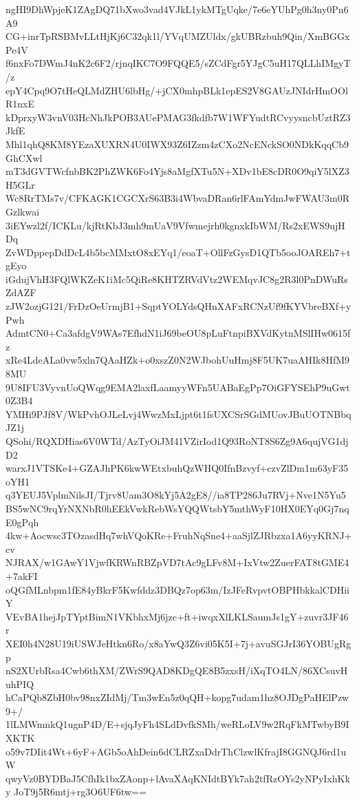 ngHI9DhWpjeK1ZAgDQ71bXwo3vad4VJkL1ykMTgUqke/7e6eYUhPg0h3ny0Pn6A9
CG+inrTpRSBMvLLtHjKj6C32qk1l/YVqUMZUldx/gkUBRzbuh9Qin/XmBGGxPe4V
f6nxFo7DWmJ4nK2c6F2/rjnqIKC7O9FQQE5/sZCdFgr5YJgC5uH17QLLhIMgyT/z
epY4Cpq9O7tHeQLMdZHU6lbHg/+jCX0mhpBLk1epES2V8GAUzJNIdrHmOOlR1nxE
kDprxyW3vnV03HcNhJkPOB3AUePMAG3fkdfb7W1WFYudtRCvyysncbUztRZ3JkfE
Mhl1qhQ8KM8YEzaXUXRN4U0IWX93Z6IZzm4zCXo2NcENckSO0NDkKqqCb9GhCXwl
mT3dGVTWcfnbBK2PhZWK6Fo4Yjs8aMgfXTu5N+XDv1bE8cDR0O9qiY5lXZ3H5GLr
Wc8RrTMs7v/CFKAGK1CGCXrS63B3i4WbvaDRan6rlFAmYdmJwFWAU3m0RGzlkwai
3iEYwzl2f/ICKLu/kjRtKbJ3mh9mUaV9Vfwmejrh0kgnxkIbWM/Rs2xEWS9ujHDq
ZvWDppepDdDcL4b5bcMMxtO8xEYq1/eoaT+OllFzGysD1QTb5ooJOAREh7+tgEyo
iGdujVhH3FQlWKZeK1iMc5QiRe8KHTZRVdVtz2WEMqvJC8g2R3l0PnDWuRsZdAZF
zJW2ozjG121/FrDzOeUrmjB1+SqptYOLYdsQHnXAFxRCNzUf9fKYVbreBXf+yPwh
AdmtCN0+Ca3afdgV9WAs7EfhdN1iJ69beOU8pLuFtnpiBXVdKytnMSlIHw0615fz
xRe4LdeALa0vw5xln7QAaHZk+o0xszZ0N2WJbohUuHmj8F5UK7uaAHIk8HfM98MU
9U8IFU3VyvnUoQWqg9EMA2laxfLaamyyWFn5UABaEgPp7OiGFYSEhP9uGwt0Z3B4
YMHi9PJf8V/WkPvhOJLeLvj4WwzMxLjpt6t1fsUXCSrSGdMUovJBuUOTNBbqJZ1j
QSohi/RQXDHias6V0WTd/AzTyOiJM41VZirIod1Q93RoNT8S6Zg9A6qujVG1djD2
warxJ1VTSKe4+GZAJhPK6kwWEtxbuhQzWHQ0IfnBzvyf+czvZlDm1m63yF35oYH1
q3YEUJ5VplmNilsJI/Tjrv8Uam3O8kYj5A2gE8//ia8TP286Ju7RVj+Nve1N5Yu5
BS5wNC9rqYrNXNbR0hEEkVwkRebWsYQQWtsbY5mthWyF10HX0EYq0Gj7nqE0gPqh
4kw+Aocwsc3TOzasdHq7whVQoKRe+FruhNqSne4+aaSjlZJRbzxa1A6yyKRNJ+cv
NJRAX/w1GAwY1VjwfKRWnRBZpVD7tAc9gLFv8M+IxVtw2ZuerFAT8tGME4+7akFI
oQGfMLnbpm1fE84yBkrF5Kwfddz3DBQz7op63m/IzJFeRvpvtOBPHbkkalCDHiiY
VEvBA1hejJpTYptBimN1VKbhxMj6jzc+ft+iwqxXlLKLSaumJs1gY+zuvr3JF46r
XEI0h4N28U19iUSWJeHtkn6Ro/x8aYwQ3Z6vi05K5I+7j+avuSGJrI36YOBUgRgp
nS2XUrbRsa4Cwb6thXM/ZWrS9QAD8KDgQE8B5zxsH/iXqTO4LN/86XCsuvHuhPIQ
hCaPQb8ZbH0bv98nxZIdMj/Tm3wEn5z0qQH+kopg7udam1hz8OJDgPaHElPzw9+/
1lLMWmnkQ1ugnP4D/E+sjqJyFh4SLdDvfkSMh/weRLoLV9w2RqFkMTwbyB9IXKTK
o59v7DIit4Wt+6yF+AGb5oAhDein6dCLRZxaDdrThClzwlKfrajI8GGNQJ6rd1uW
qwyVz0BYDBaJ5CfhIk1bxZAonp+lAvaXAqKNIdtBYk7ah2tfRzOYs2yNPyIxhKky
JoT9j5R6mtj+rg3O6UF6tw==
